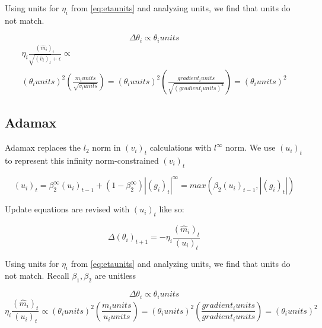 \documentclass{article}
\begin{document}
	Using units for $\eta_{i}$ from \ref{eq:etaunits} and analyzing units, we find that units do not match.
	
	 \begin{center} 
		\begin{equation}  \Delta \theta_{i} \propto \theta_{i} units \end{equation}  
		\begin{equation}  
		\begin{split}
		    \eta_{i} \frac{(\hat{m}_{i})_{t}}{\sqrt{(\hat{v}_{i})_{t}} + \epsilon} \propto \\
         	(\theta_{i} units)^{2} (\frac{m_{i} units}{\sqrt{v_{i} units}}) = (\theta_{i} units)^{2} (\frac{gradient_{i} units}{\sqrt{(gradient_{i} units)^{2}}}) = (\theta_{i} units)^{2} 
        \end{split}
		\end{equation}
	\end{center}
	
\subsection{Adamax}
	Adamax \cite{adam} replaces the $l_{2}$ norm in $(v_{i})_{t}$ calculations with $l^{\infty}$ norm. We use $(u_{i})_{t}$ to represent this infinity norm-constrained $(v_{i})_{t}$ 
	
	\begin{center} 
		\begin{equation} (u_{i})_{t} = \beta^{\infty}_{2} (u_{i})_{t-1} + (1 - \beta^{\infty}_{2}) |(g_i)_{t}|^{\infty}  = max(\beta_{2}(u_{i})_{t-1}, |(g_i)_{t}|)\end{equation}
	\end{center}
	
	Update equations are revised with $(u_{i})_{t}$ like so:
	
	\begin{center} 
		\begin{equation} \Delta (\theta_{i})_{t+1} =  - \eta_{i} \frac{(\hat{m}_{i})_{t}}{(u_{i})_{t}} 	\label{eq:adamax} \end{equation}
	\end{center}	

	Using units for $\eta_{i}$ from \ref{eq:etaunits}  and analyzing units, we find that units do not match. Recall $\beta_{1}, \beta_{2}$ are unitless

	\begin{center} 
		\begin{equation}  \Delta \theta_{i} \propto \theta_{i} units \end{equation}  
		\begin{equation}  \eta_{i} \frac{(\hat{m}_{i})_{t}}{(u_{i})_{t}} \propto (\theta_{i} units)^{2} (\frac{m_{i} units}{u_{i} units}) = (\theta_{i} units)^{2} (\frac{gradient_{i} units}{gradient_{i} units}) = (\theta_{i} units)^{2} \end{equation}
	\end{center}
\end{document}
